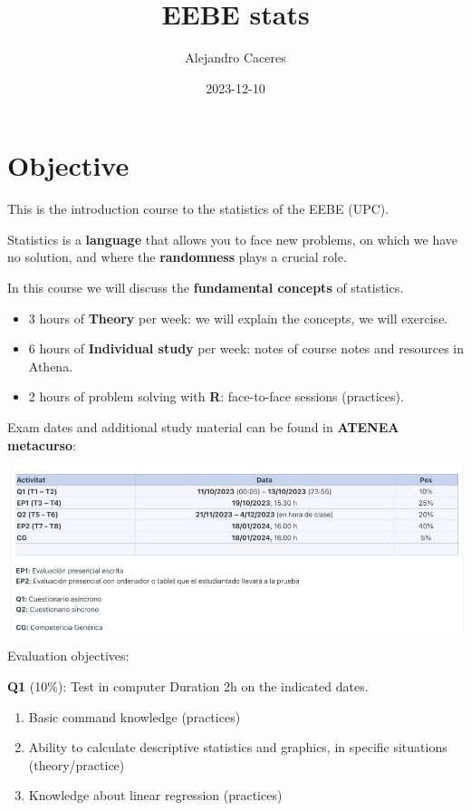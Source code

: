 \documentclass[
]{book}
\title{EEBE stats}
\author{Alejandro Caceres}
\date{2023-12-10}
\providecommand{\tightlist}{%
  \setlength{\itemsep}{0pt}\setlength{\parskip}{0pt}}
\begin{document}
\maketitle

{
\setcounter{tocdepth}{1}
\tableofcontents
}
\hypertarget{objective}{%
\chapter{Objective}\label{objective}}

This is the introduction course to the statistics of the EEBE (UPC).

Statistics is a \textbf{language} that allows you to face new problems, on which we have no solution, and where the \textbf{randomness} plays a crucial role.

In this course we will discuss the \textbf{fundamental concepts} of statistics.

\begin{itemize}
\item
  3 hours of \textbf{Theory} per week: we will explain the concepts, we will exercise.
\item
  6 hours of \textbf{Individual study} per week: notes of course notes and resources in Athena.
\item
  2 hours of problem solving with \textbf{R}: face-to-face sessions (practices).
\end{itemize}

Exam dates and additional study material can be found in \textbf{ATENEA metacurso}:

\includegraphics{./figures/notas.JPG}

Evaluation objectives:

\textbf{Q1} (10\%): Test in computer Duration 2h on the indicated dates.

\begin{enumerate}
\def\labelenumi{\alph{enumi}.}
\tightlist
\item
  Basic command knowledge (practices)
\item
  Ability to calculate descriptive statistics and graphics, in specific situations (theory/practice)
\item
  Knowledge about linear regression (practices)
\end{enumerate}
\end{document}

